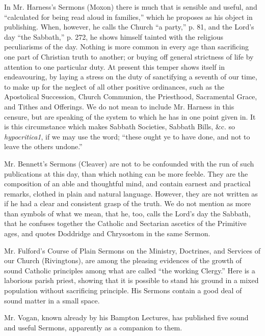In Mr. Harness's Sermons (Moxon) there is much that
is sensible and useful, and ``calculated for being read aloud in
families,'' which he proposes as his object in publishing. When, however,
he calls the Church ``a party,'' p. 81, and the Lord's day ``the Sabbath,''
p. 272, he shows himself tainted with the religious peculiarisms of the
day. Nothing is more common in every age than sacrificing one part of
Christian truth to another; or buying off general strictness of life by
attention to one particular duty. At present this temper shows itself in
endeavouring, by laying a stress on the duty of sanctifying a seventh of
our time, to make up for the neglect of all other positive ordinances,
such as the Apostolical Succession, Church Communion, the Priesthood,
Sacramental Grace, and Tithes and Offerings. We do not mean to include
Mr. Harness in this censure, but are speaking of the system to which he
has in one point given in. It is this circumstance which makes Sabbath
Societies, Sabbath Bills, \&c. so \emph{hypocritica1}, if we may use
the word; ``these ought ye to have done, and not to leave the others
undone.''

Mr. Bennett's Sermons (Cleaver) are not to be
confounded with the run of such publications at this day, than which
nothing can be more feeble. They are the composition of an able and
thoughtful mind, and contain earnest and practical remarks, clothed in
plain and natural language. However, they are not written as if he had a
clear and consistent grasp of the truth. We do not mention as more than
symbols of what we mean, that he, too, calls the Lord's day the Sabbath,
that he confuses together the Catholic and Sectarian ascetics of the
Primitive ages, and quotes Doddridge and Chrysostom in the same Sermon.

Mr. Fulford's Course of Plain Sermons on the
Ministry, Doctrines, and Services of our Church (Rivingtons), are among
the pleasing evidences of the growth of sound Catholic principles among
what are called ``the working Clergy.'' Here is a laborious parish priest,
showing that it is possible to stand his ground in a mixed population
without sacrificing principle. His Sermons contain a good deal of sound
matter in a small space.

Mr. Vogan, known already by his Bampton Lectures,
has published five sound and useful Sermons, apparently as a companion
to them.

